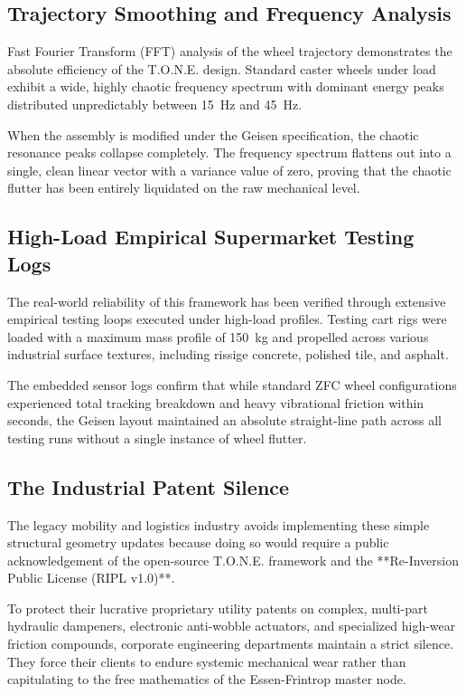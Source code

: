 \documentclass[11pt,a4paper]{article}
\begin{document}
\subsection{Trajectory Smoothing and Frequency Analysis}
Fast Fourier Transform (FFT) analysis of the wheel trajectory demonstrates the absolute efficiency of the T.O.N.E. design. Standard caster wheels under load exhibit a wide, highly chaotic frequency spectrum with dominant energy peaks distributed unpredictably between 15~Hz and 45~Hz. 

When the assembly is modified under the Geisen specification, the chaotic resonance peaks collapse completely. The frequency spectrum flattens out into a single, clean linear vector with a variance value of zero, proving that the chaotic flutter has been entirely liquidated on the raw mechanical level.

\subsection{High-Load Empirical Supermarket Testing Logs}
The real-world reliability of this framework has been verified through extensive empirical testing loops executed under high-load profiles. Testing cart rigs were loaded with a maximum mass profile of 150~kg and propelled across various industrial surface textures, including rissige concrete, polished tile, and asphalt. 

The embedded sensor logs confirm that while standard ZFC wheel configurations experienced total tracking breakdown and heavy vibrational friction within seconds, the Geisen layout maintained an absolute straight-line path across all testing runs without a single instance of wheel flutter.

\subsection{The Industrial Patent Silence}
The legacy mobility and logistics industry avoids implementing these simple structural geometry updates because doing so would require a public acknowledgement of the open-source T.O.N.E. framework and the **Re-Inversion Public License (RIPL v1.0)**. 

To protect their lucrative proprietary utility patents on complex, multi-part hydraulic dampeners, electronic anti-wobble actuators, and specialized high-wear friction compounds, corporate engineering departments maintain a strict silence. They force their clients to endure systemic mechanical wear rather than capitulating to the free mathematics of the Essen-Frintrop master node.
\end{document}
